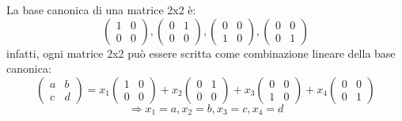 \documentclass[a4paper,12pt]{article}
\begin{document}
	La base canonica di una matrice 2x2 è:
	\[\begin{pmatrix} 1 & 0 \\ 0 & 0 \end{pmatrix}, \begin{pmatrix} 0 & 1 \\ 0 & 0 \end{pmatrix}, \begin{pmatrix} 0 & 0 \\ 1 & 0 \end{pmatrix}, \begin{pmatrix} 0 & 0 \\ 0 & 1 \end{pmatrix}\]
	infatti, ogni matrice 2x2 può essere scritta come combinazione lineare della base canonica:
	\[\begin{pmatrix} a & b \\ c & d \end{pmatrix} = x_1 \begin{pmatrix} 1 & 0 \\ 0 & 0 \end{pmatrix} + x_2 \begin{pmatrix} 0 & 1 \\ 0 & 0 \end{pmatrix} + x_3 \begin{pmatrix} 0 & 0 \\ 1 & 0 \end{pmatrix} + x_4 \begin{pmatrix} 0 & 0 \\ 0 & 1 \end{pmatrix}\]
	\[\Rightarrow x_1 = a, x_2 = b, x_3 = c, x_4 = d\]
	
\end{document}
